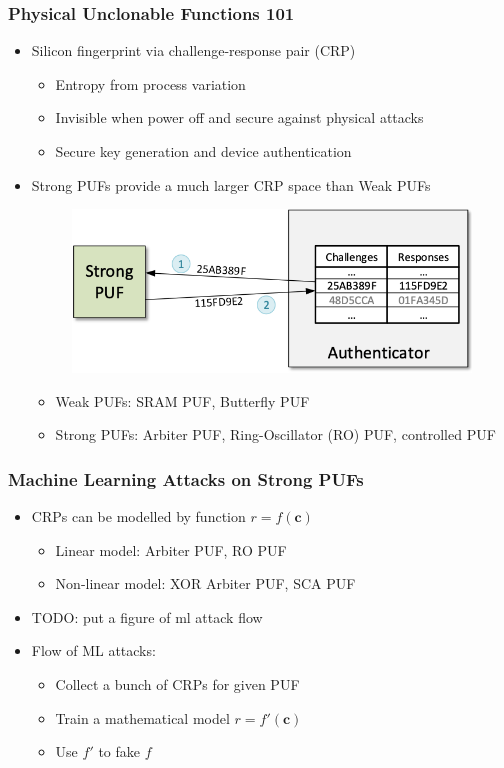 \begin{frame}
\titlepage %
\end{frame}
\begin{frame}
\frametitle{Physical Unclonable Functions 101}
\begin{itemize}
\item	Silicon fingerprint via challenge-response pair (CRP)
	\begin{itemize}
	\item	Entropy from process variation
	\item	Invisible when power off and secure against physical attacks
	\item	Secure key generation and device authentication
	\end{itemize}
\item	Strong PUFs provide a much larger CRP space than Weak PUFs 
\begin{figure}
\centering
\includegraphics[width=.8\linewidth]{fig/PUFCRP.png}
\end{figure}
    \begin{itemize}
        \item Weak PUFs: SRAM PUF, Butterfly PUF
        \item Strong PUFs: Arbiter PUF, Ring-Oscillator (RO) PUF, controlled PUF
    \end{itemize}
\end{itemize}
\end{frame}

\begin{frame}
\frametitle{Machine Learning Attacks on Strong PUFs}
\begin{itemize}
    \item CRPs can be modelled by function $r=f(\mathbf{c})$
        \begin{itemize}
            \item Linear model: Arbiter PUF, RO PUF
            \item Non-linear model: XOR Arbiter PUF, SCA PUF
        \end{itemize}
    \item TODO: put a figure of ml attack flow
    \item Flow of ML attacks:
        \begin{itemize}
            \item Collect a bunch of CRPs for given PUF 
            \item Train a mathematical model $r = f'(\mathbf{c})$
            \item Use $f'$ to fake $f$
        \end{itemize}
\end{itemize}
\end{frame}

